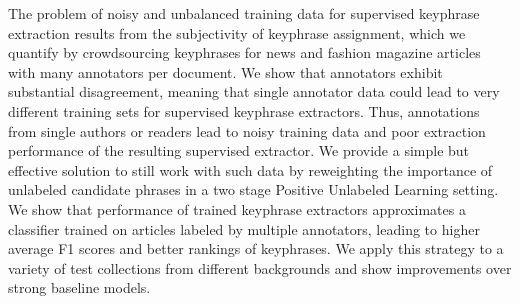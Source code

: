 The problem of noisy and unbalanced training data for supervised keyphrase extraction results from the subjectivity of keyphrase assignment, which we quantify by crowdsourcing keyphrases for news and fashion magazine articles with many annotators per document. We show that annotators exhibit substantial disagreement, meaning that single annotator data could lead to very different training sets for supervised keyphrase extractors. Thus, annotations from single authors or readers lead to noisy training data and poor extraction performance of the resulting supervised extractor. We provide a simple but effective solution to still work with such data by reweighting the importance of unlabeled candidate phrases in a two stage Positive Unlabeled Learning setting. We show that performance of trained keyphrase extractors approximates a classifier trained on articles labeled by multiple annotators, leading to higher average F1 scores and better rankings of keyphrases. We apply this strategy to a variety of test collections from different backgrounds and show improvements over strong baseline models.
